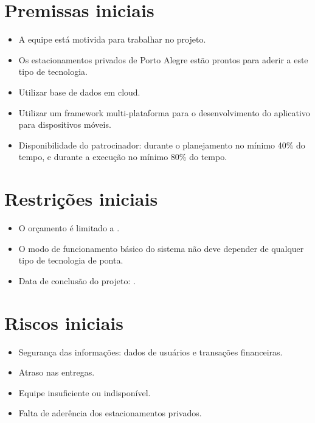 


\section{Premissas iniciais}

\begin{itemize}
	\item A equipe está motivida para trabalhar no projeto.
	\item Os estacionamentos privados de Porto Alegre estão prontos para aderir a este tipo de tecnologia.
	\item Utilizar base de dados em cloud.
	\item Utilizar um framework multi-plataforma para o desenvolvimento do aplicativo para dispositivos móveis.
	\item Disponibilidade do patrocinador: durante o planejamento no mínimo 40\% do tempo, e durante a execução no mínimo 80\% do tempo.
\end{itemize}

\section{Restrições iniciais}

\begin{itemize}
	\item O orçamento é limitado a \maximumBudget.
	\item O modo de funcionamento básico do sistema não deve depender de qualquer tipo de tecnologia de ponta.
	\item Data de conclusão do projeto: \maximumDeadline.
\end{itemize}

\section{Riscos iniciais}

\begin{itemize}
	\item Segurança das informações: dados de usuários e transações financeiras.
	\item Atraso nas entregas.
	\item Equipe insuficiente ou indisponível.
	\item Falta de aderência dos estacionamentos privados. %
\end{itemize}

